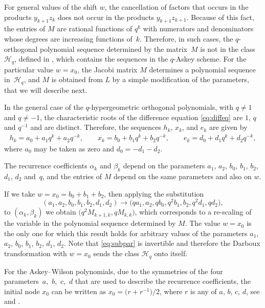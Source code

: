 \documentclass[10pt,a4paper]{amsart}
\def\cH{\mathcal H}
\numberwithin{equation}{section}
\begin{document}
For general values of the shift $w$, the cancellation of factors that occurs in the products $y_{k+1} z_k$ does not occur in the products $ y_{k+1} z_{k+1}$. Because of this fact, the entries of $M$ are rational functions of $q^k$ with numerators and denominators whose degrees are increasing functions of~$k$. Therefore, in such cases, the $q$-orthogonal polynomial sequence determined by the matrix~$M$ is not in the class $\cH_q$, defined in \cite[Section~7]{Uni}, which contains the sequences in the $q$-Askey scheme. For the particular value $w=x_0$, the Jacobi matrix $M$ determines a polynomial sequence in~$\cH_q$, and $M$ is obtained from $L$ by a simple modification of the parameters, that we will describe next.

In the general case of the $q$-hypergeometric orthogonal polynomials, with $q\ne 1$ and ${q \ne -1}$, the characteristic roots of the difference equation \eqref{eq:diffeq} are $1$, $q$ and $q^{-1}$ and are distinct.
Therefore, the sequences $h_k$, $ x_k$, and $e_k$ are given by
\begin{gather*} %
h_k= a_0 + a_1 q^k + a_2 q^{-k}, \qquad
	x_k= b_0 + b_1 q^k + b_2 q^{-k}, \qquad
	e_k= d_0 + d_1 q^k + d_2 q^{-k},
\end{gather*}
where $a_0$ may be taken as zero and $d_0=-d_1 -d_2$.

The recurrence coefficients $\alpha_k$ and $\beta_k$ depend on the parameters $a_1$, $a_2$, $b_0$, $b_1$, $b_2$, $d_1$, $d_2$ and~$q$, and the entries of $M$ depend on the same parameters and also on $w$.

If we take $w=x_0=b_0+b_1+b_2$, then applying the substitution
\begin{equation}\label{eq:subpar}
	( a_1, a_2, b_0, b_1, b_2, d_1, d_2)\rightarrow \bigl( q a_1, a_2, q b_0, q^2 b_1, b_2, q^2 d_1, q d_2\bigr),
\end{equation}
to $(\alpha_k, \beta_k)$ we obtain $\bigl( q^2 M_{k+1,k}, q M_{k,k}\bigr)$, which corresponds to a re-scaling of the variable in the polynomial sequence determined by $M$. The value $w=x_0$ is the only one for which this result holds for arbitrary values of the parameters $a_1$, $a_2$, $b_0$, $b_1$, $b_2$, $d_1$, $d_2$. Note that \eqref{eq:subpar} is invertible and therefore the Darboux transformation with $w=x_0$ sends the class $\cH_q$ onto itself.

For the Askey--Wilson polynomials, due to the symmetries of the four parameters~$a$,~$b$,~$c$,~$d$ that are used to describe the recurrence coefficients, the initial node $x_0$ can be written as $x_0=\bigl(r+ r^{-1}\bigr)/2$, where $r$ is any of $a$, $b$, $c$, $d$, see \cite[equation~(14.1.5)]{Hyp} and \cite[equation~(7.15)]{Uni}.
\end{document}
